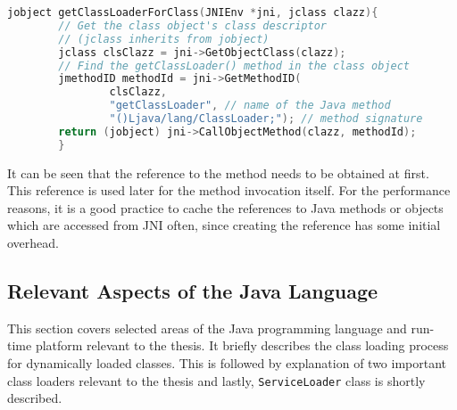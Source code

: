 \begin{lstlisting}[language=c++]
        jobject getClassLoaderForClass(JNIEnv *jni, jclass clazz){
        // Get the class object's class descriptor
        // (jclass inherits from jobject)
        jclass clsClazz = jni->GetObjectClass(clazz);
        // Find the getClassLoader() method in the class object
        jmethodID methodId = jni->GetMethodID(
		        clsClazz,
		        "getClassLoader", // name of the Java method
		        "()Ljava/lang/ClassLoader;"); // method signature
        return (jobject) jni->CallObjectMethod(clazz, methodId);
        }
\end{lstlisting}

It can be seen that the reference to the method needs to be obtained at first. This reference is used later for the method invocation itself. For the performance reasons, it is a good practice to cache the references to Java methods or objects which are accessed from JNI often, since creating the reference has some initial overhead.

\subsection{Relevant Aspects of the  Java Language}
This section covers selected areas of the Java programming language and run-time platform relevant to the thesis. It briefly describes the class loading process for dynamically loaded classes. This is followed by explanation of two important class loaders relevant to the thesis and lastly, \texttt{ServiceLoader} class is shortly described.
